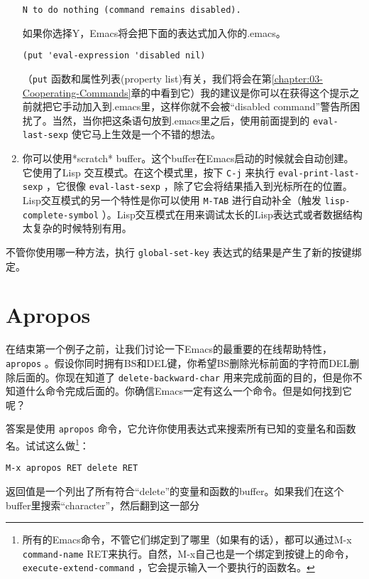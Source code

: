 \begin{enumerate}
\begin{verbatim}
N to do nothing (command remains disabled).
\end{verbatim}
如果你选择Y，Emacs将会把下面的表达式加入你的.emacs。
\begin{verbatim}
(put 'eval-expression 'disabled nil)
\end{verbatim}
（\texttt{put} 函数和属性列表(property list)有关，我们将会在第\ref{chapter:03-Cooperating-Commands}章的中看到它）我的建议是你可以在获得这个提示之前就把它手动加入到.emacs里，这样你就不会被“disabled command”警告所困扰了。当然，当你把这条语句放到.emacs里之后，使用前面提到的 \texttt{eval-last-sexp} 使它马上生效是一个不错的想法。
  \item 你可以使用*scratch* buffer。这个buffer在Emacs启动的时候就会自动创建。它使用了Lisp 交互模式。在这个模式里，按下 \verb|C-j| 来执行 \texttt{eval-print-last-sexp} ，它很像 \texttt{eval-last-sexp} ，除了它会将结果插入到光标所在的位置。Lisp交互模式的另一个特性是你可以使用 \verb|M-TAB| 进行自动补全（触发 \texttt{lisp-complete-symbol} ）。Lisp交互模式在用来调试太长的Lisp表达式或者数据结构太复杂的时候特别有用。
\end{enumerate}

不管你使用哪一种方法，执行 \texttt{global-set-key} 表达式的结果是产生了新的按键绑定。

\section{Apropos}
\label{section:01-Apropos}

在结束第一个例子之前，让我们讨论一下Emacs的最重要的在线帮助特性， \texttt{apropos} 。假设你同时拥有BS和DEL键，你希望BS删除光标前面的字符而DEL删除后面的。你现在知道了 \texttt{delete-backward-char} 用来完成前面的目的，但是你不知道什么命令完成后面的。你确信Emacs一定有这么一个命令。但是如何找到它呢？

答案是使用 \texttt{apropos} 命令，它允许你使用表达式来搜索所有已知的变量名和函数名。试试这么做\footnote{所有的Emacs命令，不管它们绑定到了哪里（如果有的话），都可以通过M-x \texttt{command-name} RET来执行。自然，M-x自己也是一个绑定到按键上的命令， \texttt{execute-extend-command} ，它会提示输入一个要执行的函数名。}：

\begin{verbatim}
M-x apropos RET delete RET
\end{verbatim}

返回值是一个列出了所有符合“delete”的变量和函数的buffer。如果我们在这个buffer里搜索“character”，然后翻到这一部分

